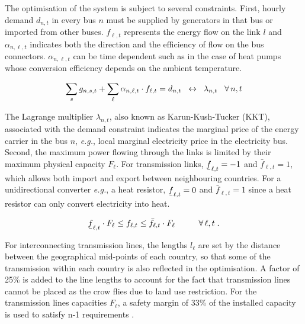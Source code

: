 \documentclass[3p]{elsarticle} %
\newcommand{\ubar}[1]{\text{\b{$#1$}}}
\begin{document}
The optimisation of the system is subject to several constraints. First, hourly demand $d_{n,t}$ in every bus $n$ must be supplied by generators in that bus or imported from other buses. $f_{\ell,t}$ represents the energy flow on the link $l$ and $\alpha_{n,\ell,t}$ indicates both the direction and the efficiency of flow on the bus connectors.  $\alpha_{n,\ell,t}$ can be time dependent such as in the case of heat pumps whose conversion efficiency depends on the ambient temperature.

\begin{equation}
\sum_{s} g_{n,s,t}+ \sum_{\ell} \alpha_{n,\ell,t}\cdot f_{\ell,t} = d_{n,t} \hspace{.2cm} \leftrightarrow \hspace{0.2cm} \lambda_{n,t} \hspace{.3cm} \forall\, n,t \label{eq_energy_balance}
\end{equation}

The Lagrange multiplier $\lambda_{n,t}$,  also known as Karun-Kush-Tucker (KKT),  associated with the demand constraint indicates the marginal price of the energy carrier in the bus $n$, \textit{e.g.}, local marginal electricity price in the electricity bus. \\

Second, the maximum power flowing through the links is limited by their maximum physical capacity $F_{\ell}$. For transmission links, $\ubar{f}_{\ell,t}=-1$ and $\bar{f}_{\ell,t}=1$, which allows both import and export between neighbouring countries. For a unidirectional converter \textit{e.g.}, a heat resistor, $\ubar{f}_{\ell,t}=0$ and $\bar{f}_{\ell,t}=1$ since a heat resistor can only convert electricity into heat.

\begin{equation}
\ubar{f}_{\ell,t} \cdot F_{\ell} \leq f_{\ell,t} \leq \bar{f}_{\ell,t} \cdot F_{\ell} \hspace{1cm} \forall\, \ell,t \; . \label{eq_links}
\end{equation}

For interconnecting transmission lines, the lengths $l_{\ell}$ are set by the distance between the geographical mid-points of each country, so that some of the transmission within each country is also reflected in the optimisation. A factor of 25\% is added to the line lengths to account for the fact that transmission lines cannot be placed as the crow flies due to land use restriction. For the transmission lines capacities $F_{\ell}$, a safety margin of 33\% of the installed capacity is used to satisfy n-1 requirements \cite{Brown_2016}. \\ %
\end{document}
